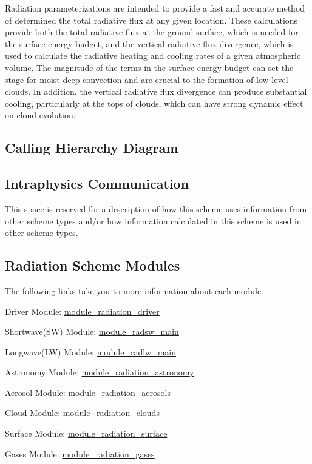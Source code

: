 Radiation parameterizations are intended to provide a fast and accurate method of determined the total radiative flux at any given location. These calculations provide both the total radiative flux at the ground surface, which is needed for the surface energy budget, and the vertical radiative flux divergence, which is used to calculate the radiative heating and cooling rates of a given atmospheric volume. The magnitude of the terms in the surface energy budget can set the stage for moist deep convection and are crucial to the formation of low-\/level clouds. In addition, the vertical radiative flux divergence can produce substantial cooling, particularly at the tops of clouds, which can have strong dynamic effect on cloud evolution.\hypertarget{group__rad_diagram}{}\subsection{Calling Hierarchy Diagram}\label{group__rad_diagram}
 \hypertarget{group__rad_intraphysics}{}\subsection{Intraphysics Communication}\label{group__rad_intraphysics}
This space is reserved for a description of how this scheme uses information from other scheme types and/or how information calculated in this scheme is used in other scheme types. \hypertarget{group__rad_mainpage-components}{}\subsection{Radiation Scheme Modules}\label{group__rad_mainpage-components}
The following links take you to more information about each module.
\begin{DoxyItemize}
\item Driver Module\+: \hyperlink{group__module__radiation__driver}{module\+\_\+radiation\+\_\+driver}
\item Shortwave(\+S\+W) Module\+: \hyperlink{group__module__radsw__main}{module\+\_\+radsw\+\_\+main}
\item Longwave(\+L\+W) Module\+: \hyperlink{group__module__radlw__main}{module\+\_\+radlw\+\_\+main}
\item Astronomy Module\+: \hyperlink{group__module__radiation__astronomy}{module\+\_\+radiation\+\_\+astronomy}
\item Aerosol Module\+: \hyperlink{group__module__radiation__aerosols}{module\+\_\+radiation\+\_\+aerosols}
\item Cloud Module\+: \hyperlink{group__module__radiation__clouds}{module\+\_\+radiation\+\_\+clouds}
\item Surface Module\+: \hyperlink{group__module__radiation__surface}{module\+\_\+radiation\+\_\+surface}
\item Gases Module\+: \hyperlink{group__module__radiation__gases}{module\+\_\+radiation\+\_\+gases} 
\end{DoxyItemize}